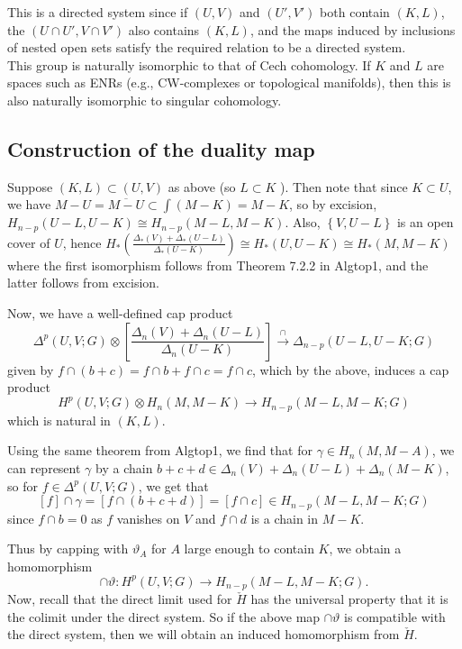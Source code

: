 \documentclass[reqno]{amsart}
\theoremstyle{definition}
\theoremstyle{remark}
\begin{document}
    This is a directed system since if
    $\left( U,V \right) $ and
    $\left( U',V' \right) $ both contain $(K,L)$, the
    $\left( U \cap U', V \cap V' \right) $ also contains
    $\left( K, L \right) $, and the maps
    induced by inclusions of nested open sets satisfy the
    required relation to be a directed system.\\

    This group is naturally isomorphic to that of Cech cohomology. If
    $K$ and $L$ are spaces such as ENRs (e.g., CW-complexes or
    topological manifolds), then this is also naturally
    isomorphic to singular cohomology.

    \subsection{Construction of the duality map}
    Suppose $(K, L) \subset (U,V)$ as above (so 
    $L \subset K$ ).
    Then note that since $K \subset U$, we have
    $M - U = \overline{M - U} \subset \int (M - K) = M - K$, so
    by excision,
    $H_{n-p} (U-L, U -K) \cong
    H_{n-p}(M-L, M - K)$.
    Also,
    $\left\{ V, U - L \right\} $ is an open cover of $U$, hence
    $H_* \left( 
    \frac{\Delta_* (V) + \Delta_* (U-L)}{\Delta_* (U - K)}\right) 
    \cong H_* \left( U, U-K \right) \cong
    H_* (M, M-K)$ where the first isomorphism follows
    from Theorem 7.2.2 in Algtop1, and the latter follows
    from excision.


    Now, we have a well-defined cap
    product
    \[
    \Delta^{p} \left( U, V;G \right) \otimes
    \left[ \frac{\Delta_n (V) + \Delta_n (U - L)}{\Delta_n (U-K)} \right] 
    \stackrel{\cap}{\to} \Delta_{n-p} \left( U -L, U-K;G \right) 
    \] 
    given by $f \cap (b+c) = f\cap b+ f \cap c = f \cap c$, which
    by the above, induces a cap product
    \[
    H^{p}(U,V;G) \otimes
    H_n(M, M-K) \to H_{n-p} (M - L, M- K;G)
    \] 
    which is  natural in $(K,L)$.

    Using the same theorem from Algtop1, we find that
    for $\gamma \in H_n (M, M-A)$, we can represent $\gamma$ by
    a chain $b+c+d \in 
    \Delta_n (V) + \Delta_n (U-L) + \Delta_n (M-K)$, so for
    $f \in \Delta^{p}(U,V;G)$, we get that
    \[
    \left[ f \right] \cap \gamma = 
    \left[ f \cap (b + c + d) \right] 
    = \left[ f \cap c \right] \in 
    H_{n-p} (M-L, M-K;G)
    \] 
    since $f \cap b = 0$ as $f$ vanishes on $V$ and
    $f \cap d$ is a chain in $M-K$.

    Thus by capping with $\vartheta_A$ for
    $A$ large enough to contain
    $K$, we obtain a homomorphism
    \[
    \cap \vartheta \colon
    H^{p} \left( U, V ; G \right) \to 
    H_{n-p} (M-L, M - K;G).
    \] 
    Now, recall that the direct limit
    used for $\check{H}$ has the universal property that it
    is the colimit under the direct system.
    So if the above map
    $\cap \vartheta$ is compatible with the direct system, then
    we will obtain an induced homomorphism
    from $\check{H}$.
\end{document}
